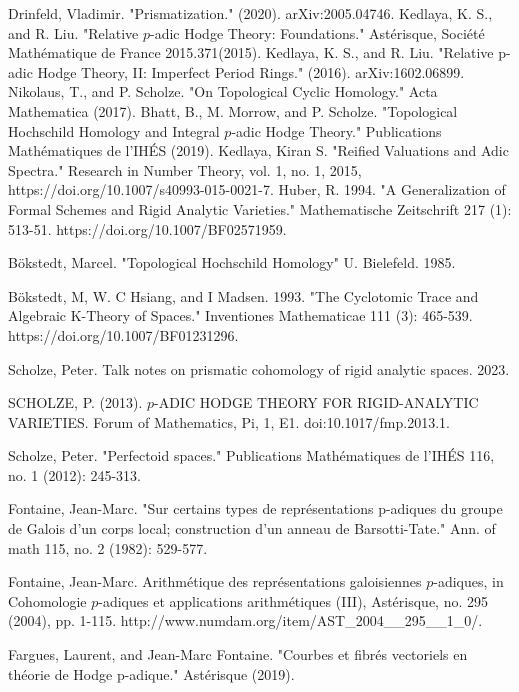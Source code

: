 \documentclass[12pt]{book}
\begin{document}
\begin{thebibliography}{}
 Drinfeld, Vladimir. "Prismatization." (2020). arXiv:2005.04746.
 Kedlaya, K. S., and  R. Liu. "Relative $p$-adic Hodge Theory: Foundations." Ast\'erisque, Soci\'et\'e Math\'ematique de France 2015.371(2015).
 Kedlaya, K. S., and  R. Liu. "Relative p-adic Hodge Theory, II: Imperfect Period Rings." (2016). arXiv:1602.06899.
 Nikolaus, T., and  P. Scholze. "On Topological Cyclic Homology." Acta Mathematica (2017).
 Bhatt, B.,  M. Morrow, and  P. Scholze. "Topological Hochschild Homology and Integral $p$-adic Hodge Theory." Publications Math\'ematiques de l'IH\'ES (2019).
 Kedlaya, Kiran S. "Reified Valuations and Adic Spectra." Research in Number Theory, vol. 1, no. 1, 2015, https://doi.org/10.1007/s40993-015-0021-7.
 Huber, R. 1994. "A Generalization of Formal Schemes and Rigid Analytic Varieties." Mathematische Zeitschrift 217 (1): 513-51. https://doi.org/10.1007/BF02571959.

 B\"okstedt, Marcel. "Topological Hochschild Homology" U. Bielefeld. 1985.

 B\"okstedt, M, W. C Hsiang, and I Madsen. 1993. "The Cyclotomic Trace and Algebraic K-Theory of Spaces." Inventiones Mathematicae 111 (3): 465-539. https://doi.org/10.1007/BF01231296.

 Scholze, Peter. Talk notes on prismatic cohomology of rigid analytic spaces. 2023.

 SCHOLZE, P. (2013). $p$-ADIC HODGE THEORY FOR RIGID-ANALYTIC VARIETIES. Forum of Mathematics, Pi, 1, E1. doi:10.1017/fmp.2013.1.

 Scholze, Peter. "Perfectoid spaces." Publications Math\'ematiques de l'IH\'ES 116, no. 1 (2012): 245-313.


 Fontaine, Jean-Marc. "Sur certains types de repr\'esentations p-adiques du groupe de Galois d'un corps local; construction d'un anneau de Barsotti-Tate." Ann. of math 115, no. 2 (1982): 529-577.

 Fontaine, Jean-Marc. Arithm\'etique des repr\'esentations galoisiennes $p$-adiques, in Cohomologie $p$-adiques et applications arithm\'etiques (III), Ast\'erisque, no. 295 (2004), pp. 1-115. http://www.numdam.org/item/AST\_2004\_\_295\_\_1\_0/.

 Fargues, Laurent, and Jean-Marc Fontaine. "Courbes et fibr\'es vectoriels en th\'eorie de Hodge p-adique." Ast\'erisque (2019).


\end{thebibliography}
\end{document}
